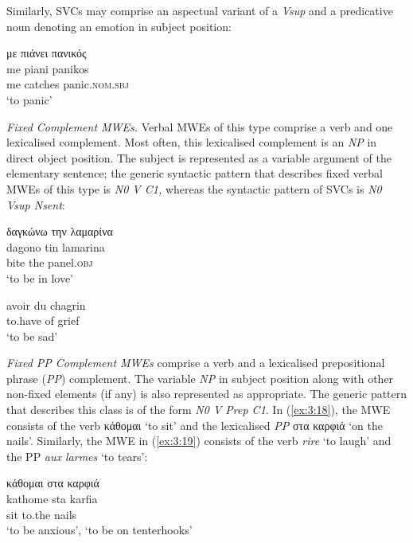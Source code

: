 \documentclass[output=paper]{langsci/langscibook}
\begin{document}
Similarly,  SVCs may comprise an aspectual variant of a \textit{Vsup
}and a predicative noun denoting an emotion in subject position:

\begin{exe}
\ex \label{ex:3:15}
\glll  με πιάνει πανικός \\
me piani panikos\\
me catches panic.\textsc{nom.sbj}\\
\glt %
‘to panic’
\end{exe}

\textit{Fixed Complement MWEs.} Verbal MWEs of this type
comprise a verb and one lexicalised complement. Most often, this
lexicalised complement is an \textit{NP }in direct object
position. The subject is represented as a variable argument of the
elementary sentence; the generic syntactic pattern that describes fixed
verbal MWEs of this type is \textit{N0 V C1, }whereas the
syntactic pattern of SVCs is \textit{N0 Vsup Nsent}:

\begin{exe}
\ex \label{ex:3:16}
\glll   δαγκώνω την λαμαρίνα \\
dagono tin lamarina\\
bite the panel.\textsc{obj}\\
\glt %
‘to be in love’
\end{exe}

\begin{exe}
\ex \label{ex:3:17}
\gll avoir du chagrin \\
to.have of grief\\
\glt ‘to be sad’\\
\end{exe}

\textit{Fixed PP Complement MWEs} comprise a verb and a lexicalised
prepositional phrase (\textit{PP}) complement. The variable \textit{NP}
in subject position along with other non-fixed elements (if any) is
also represented as appropriate. The generic pattern that describes
this class is of the form \textit{N0 V Prep C1}. In  (\ref{ex:3:18}), the  MWE consists of the verb κάθομαι ‘to sit’
and the lexicalised \textit{PP} στα καρφιά ‘on the nails’.
Similarly, the  MWE in (\ref{ex:3:19}) consists of the verb \textit{rire }‘to
laugh’ and the PP \textit{aux larmes }‘to tears’:


\begin{exe}
\ex \label{ex:3:18}
\glll  κάθομαι στα καρφιά \\
kathome sta karfia\\
sit to.the nails\\
\glt %
‘to be anxious’, ‘to be on tenterhooks’
\end{exe}
\end{document}
